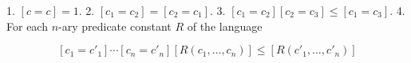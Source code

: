 1. $[c = c] = 1$.
2. $[c_1 = c_2] = [c_2 = c_1]$.
3. $[c_1 = c_2][c_2 = c_3] \leq [c_1 = c_3]$.
4. For each $n$-ary predicate constant $R$ of the language

$$[c_1 = c'_1] \cdots [c_n = c'_n][R(c_1, \ldots, c_n)] \leq [R(c'_1, \ldots, c'_n)]$$
